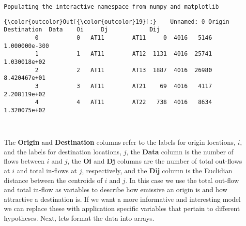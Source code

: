 \documentclass[11pt]{article}
\begin{document}
    \begin{Verbatim}[commandchars=\\\{\}]
Populating the interactive namespace from numpy and matplotlib

    \end{Verbatim}

            \begin{Verbatim}[commandchars=\\\{\}]
{\color{outcolor}Out[{\color{outcolor}19}]:}    Unnamed: 0 Origin Destination  Data    Oi     Dj            Dij
         0           0   AT11        AT11     0  4016   5146  1.000000e-300
         1           1   AT11        AT12  1131  4016  25741   1.030018e+02
         2           2   AT11        AT13  1887  4016  26980   8.420467e+01
         3           3   AT11        AT21    69  4016   4117   2.208119e+02
         4           4   AT11        AT22   738  4016   8634   1.320075e+02
\end{Verbatim}
        
    \begin{center}
    \end{center}
    { \hspace*{\fill} \\}
    
    The \textbf{Origin} and \textbf{Destination} columns refer to the
labels for origin locations, \(i\), and the labels for destination locations, \(j\),
the \textbf{Data} column is the number of flows between $i$ and $j$, the \textbf{Oi} and
\textbf{Dj} columns are the number of total out-flows at $i$ and total
in-flows at $j$, respectively, and the \textbf{Dij} column is the Euclidian
distance between the centroids of \(i\) and \(j\). In this case we use
the total out-flow and total in-flow as variables to describe how
emissive an origin is and how attractive a destination is. If we want a
more informative and interesting model we can replace these with
application specific variables that pertain to different hypotheses.
Next, lets format the data into arrays.
\end{document}
